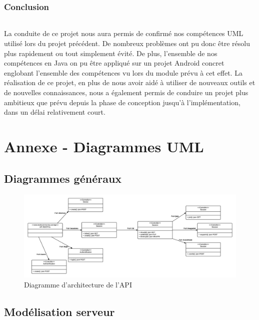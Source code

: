 \documentclass[titlepage, 12pt]{report}
\begin{document}
\section{Conclusion}

\paragraph{}La conduite de ce projet nous aura permis de confirmé nos compétences UML utilisé lors du projet précédent. De nombreux problèmes ont pu donc être résolu plus rapidement ou tout simplement évité.
De plus, l'ensemble de nos compétences en Java on pu être appliqué sur un projet Android concret englobant l'ensemble des compétences vu lors du module prévu à cet effet.
La réalisation de ce projet, en plus de nous avoir aidé à utiliser de nouveaux outils et de nouvelles connaissances, nous a également permis de conduire un projet plus ambitieux que prévu depuis la phase de conception jusqu'à l'implémentation, dans un délai relativement court. 


\part{Annexe - Diagrammes UML}

\chapter{Diagrammes généraux}

\begin{figure}[!h]
	\caption{Diagramme d'architecture de l'API}
	\label{API_architecture}
	\centering
	\includegraphics[scale=0.5]{Images/diagram/API_architecture.png}
\end{figure}

\chapter{Modélisation serveur}
\end{document}
